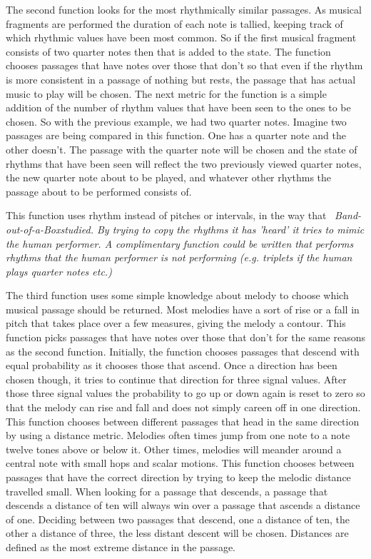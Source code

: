 \documentclass[12pt]{ucthesis}
\begin{document}
{The second function looks for the most rhythmically similar passages. As musical fragments are performed the duration of each note is tallied, keeping track of which rhythmic values have been most common. So if the first musical fragment consists of two quarter notes then that is added to the state. The function chooses passages that have notes over those that don't so that even if the rhythm is more consistent in a passage of nothing but rests, the passage that has actual music to play will be chosen. The next metric for the function is a simple addition of the number of rhythm values that have been seen to the ones to be chosen. So with the previous example, we had two quarter notes. Imagine two passages are being compared in this function. One has a quarter note and the other doesn't. The passage with the quarter note will be chosen and the state of rhythms that have been seen will reflect the two previously viewed quarter notes, the new quarter note about to be played, and whatever other rhythms the passage about to be performed consists of.

This function uses rhythm instead of pitches or intervals, in the way that ~\em{Band-out-of-a-Box}\em studied. By trying to copy the rhythms it has 'heard' it tries to mimic the human performer. A complimentary function could be written that performs rhythms that the human performer is not performing (e.g. triplets if the human plays quarter notes etc.)

The third function uses some simple knowledge about melody to choose which musical passage should be returned. Most melodies have a sort of rise or a fall in pitch that takes place over a few measures, giving the melody a contour. This function picks passages that have notes over those that don't for the same reasons as the second function. Initially, the function chooses passages that descend with equal probability as it chooses those that ascend. Once a direction has been chosen though, it tries to continue that direction for three signal values. After those three signal values the probability to go up or down again is reset to zero so that the melody can rise and fall and does not simply careen off in one direction. This function chooses between different passages that head in the same direction by using a distance metric. Melodies often times jump from one note to a note twelve tones above or below it. Other times, melodies will meander around a central note with small hops and scalar motions. This function chooses between passages that have the correct direction by trying to keep the melodic distance travelled small. When looking for a passage that descends, a passage that descends a distance of ten will always win over a passage that ascends a distance of one. Deciding between two passages that descend, one a distance of ten, the other a distance of three, the less distant descent will be chosen. Distances are defined as the most extreme distance in the passage.

}
\end{document}
